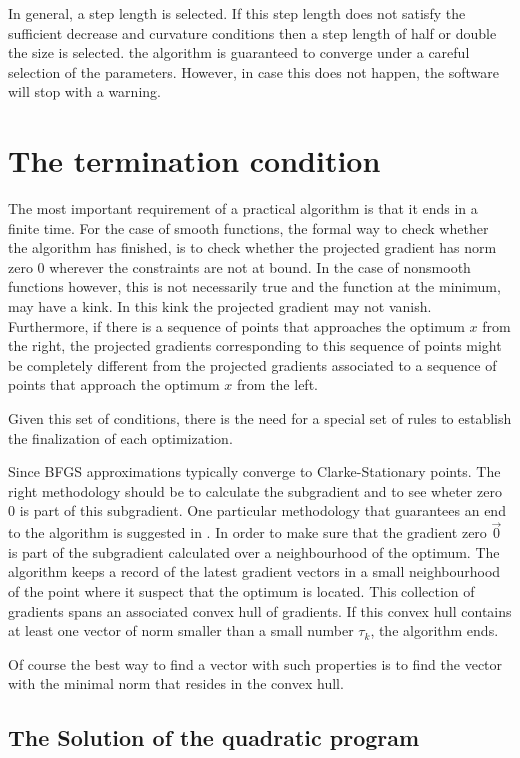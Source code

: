 In general, a step length is selected. If this step length does not satisfy the sufficient decrease and curvature conditions then a step length of half or double the size is selected. the algorithm is guaranteed to converge under a careful selection of the parameters. However, in case this does not happen, the software will stop with a warning.

\section{The termination condition}

The most important requirement of a practical algorithm is that it ends in a finite time. For the case of smooth functions, the formal way to check whether the algorithm has finished, is to check whether the projected gradient has norm zero $0$ wherever the constraints are not at bound. In the case of nonsmooth functions however, this is not necessarily true and the function at the minimum, may have a kink. In this kink the projected gradient may not vanish. Furthermore, if there is a sequence of points that approaches the optimum $x$ from the right, the projected gradients corresponding to this sequence of points might be completely different from the projected gradients associated to a sequence of points that approach the optimum $x$ from the left.

Given this set of conditions, there is the need for a special set of rules to establish the finalization of each optimization.

Since BFGS approximations typically converge to Clarke-Stationary points. The right methodology should be to calculate the subgradient and to see wheter zero $0$ is part of this subgradient. One particular methodology that guarantees an end to the algorithm is suggested in \citep{overtonlewis}. In order to make sure that the gradient zero $\vec{0}$ is part of the subgradient calculated over a neighbourhood of the optimum. The algorithm keeps a record of the latest gradient vectors in a small neighbourhood of the point where it suspect that the optimum is located. This collection of gradients spans an associated convex hull of gradients. If this convex hull contains at least one vector of norm smaller than a small number $\tau_k$, the algorithm ends.

Of course the best way to find a vector with such properties is to find the vector with the minimal norm that resides in the convex hull.

\subsection{The Solution of the quadratic program}

